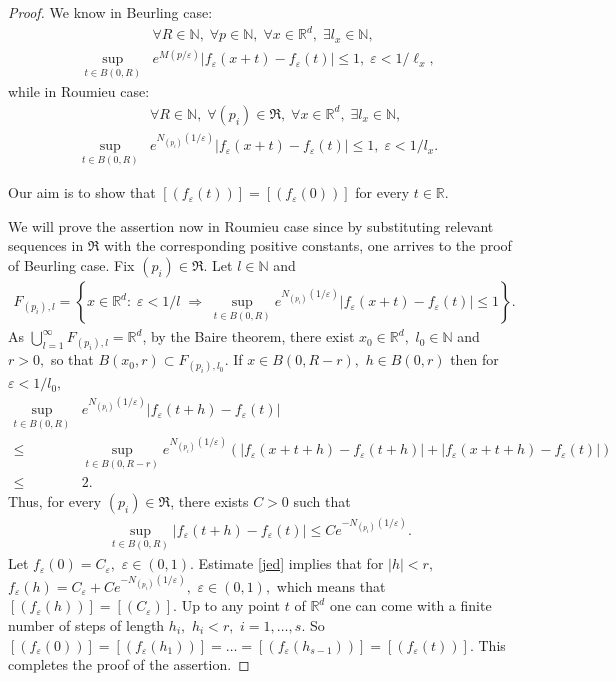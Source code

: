 \documentclass[sn-mathphys,Numbered]{sn-jnl}%
\theoremstyle{thmstyleone}%
\theoremstyle{thmstyletwo}%
\theoremstyle{thmstylethree}%
\begin{document}
\begin{proof}
We know in Beurling case:
\begin{align*}
&\forall R\in \mathbb{N},\;\forall p\in \mathbb{N},\;\forall x\in \mathbb{R}^d,\; \exists l_x\in \mathbb{N},
\\
\sup_{t\in B(0,R)}& e^{M(p/\varepsilon)} \left|f_\varepsilon(x+t)-f_\varepsilon(t)\right|\leq 1,\;  \varepsilon<1/\ell_x,
\end{align*}
while in Roumieu case:
\begin{align*}
&\forall R\in \mathbb{N},\; \forall (p_i)\in \mathfrak R,\; \forall x\in \mathbb{R}^d,\; \exists l_x\in \mathbb{N},\\
\sup_{t\in B(0,R)} & e^{N_{(p_i)}(1/\varepsilon)} \left|f_\varepsilon(x+t)-f_\varepsilon(t)\right|\leq 1, \; \varepsilon<1/l_x.
\end{align*}

 Our aim is to show that $[(f_\varepsilon(t))]=[(f_\varepsilon(0))]$ for every $t\in\mathbb{R}$. 
 
 We will prove the assertion now in Roumieu case since by substituting relevant sequences in $\mathfrak R$ with the corresponding positive constants, one arrives to the proof of Beurling case.  Fix $(p_i)\in\mathfrak R$. Let $l\in \mathbb{N}$ and 
\begin{align*}
F_{(p_i),l}=\left\{x\in \mathbb{R}^d:\; \varepsilon<1/l\; \Rightarrow\; \sup_{t\in B(0,R)}e^{N_{(p_i)}(1/\varepsilon)}|f_\varepsilon(x+t)-f_\varepsilon(t)|\leq 1 \right\}.
\end{align*}
As   $\bigcup_{l=1}^\infty F_{(p_i),l} =\mathbb R^d$, by the Baire theorem, there exist $x_0\in \mathbb{R}^d,$ $l_0\in \mathbb{N}$ and $r>0,$ so that  $B(x_0,r)\subset F_{(p_i),l_0}.$ 
If $x\in B(0,R-r),$ $h\in B(0,r)$ then for $\varepsilon<1/l_0,$
\begin{align*}
\sup_{t\in B(0,R)} & e^{N_{(p_i)}(1/\varepsilon)}|f_\varepsilon(t+h)-f_\varepsilon(t)|\\
\leq & \sup_{t\in B(0,R-r)}e^{N_{(p_i)}(1/\varepsilon)}\left(|f_\varepsilon(x+t+h)-f_\varepsilon(t+h)|+|f_\varepsilon(x+t+h)-f_\varepsilon(t)|\right)\\
\leq & 2.
\end{align*} 
Thus, for every $(p_i)\in\mathfrak R$,  there exists $C>0$ such that
\begin{align}\label{jed}
\sup_{t\in B(0,R)}|f_\varepsilon(t+h)-f_\varepsilon(t)|\leq C e^{-N_{(p_i)}(1/\varepsilon)}.
\end{align}
Let $f_\varepsilon(0)=C_\varepsilon,$ $\varepsilon\in(0,1).$ Estimate \eqref{jed} implies that for $|h|<r,$ $f_\varepsilon(h)=C_\varepsilon+Ce^{-N_{(p_i)}(1/\varepsilon)},$ $\varepsilon\in(0,1),$ which means that $[(f_\varepsilon(h))]=[(C_\varepsilon)].$ Up to any point $t$ of $\mathbb{R}^d$ one can come with a finite number of steps of length $h_i,$ $h_i<r,$ $i=1,\dots,s.$ So $[(f_\varepsilon(0))]=[(f_\varepsilon(h_1))]=\dots=[(f_\varepsilon(h_{s-1}))]=[(f_\varepsilon(t))].$
 This completes the proof of the assertion.
\end{proof}
\end{document}
